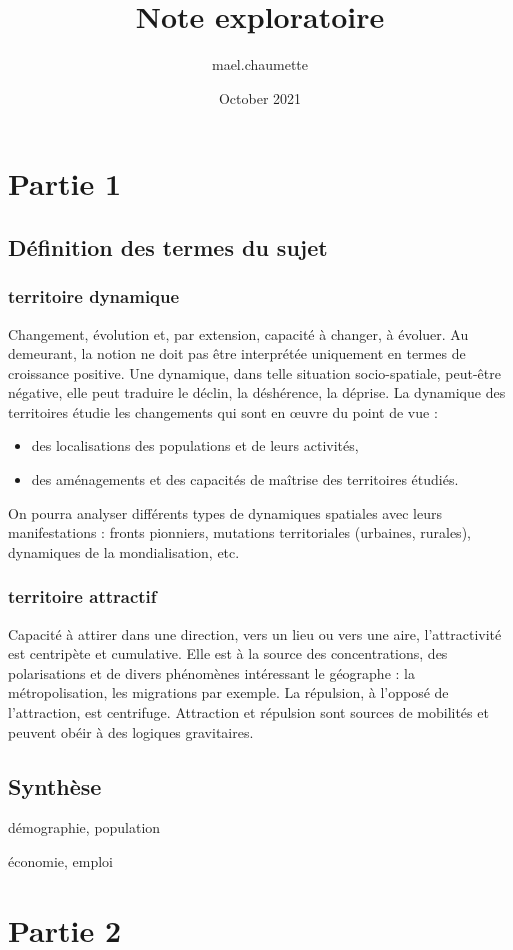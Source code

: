 \documentclass{article}
\title{Note exploratoire}
\author{mael.chaumette }
\date{October 2021}
\begin{document}
\maketitle

\section{Partie 1}
\subsection{Définition des termes du sujet}
\subsubsection{territoire dynamique}
Changement, évolution et, par extension, capacité à changer, à évoluer. Au demeurant, la notion ne doit pas être interprétée uniquement en termes de croissance positive. Une dynamique, dans telle situation socio-spatiale, peut-être négative, elle peut traduire le déclin, la déshérence, la déprise. La dynamique des territoires étudie les changements qui sont en œuvre du point de vue :
\begin{itemize}
    \item des localisations des populations et de leurs activités,
    \item des aménagements et des capacités de maîtrise des territoires étudiés.
\end{itemize}
On pourra analyser différents types de dynamiques spatiales avec leurs manifestations : fronts pionniers, mutations territoriales (urbaines, rurales), dynamiques de la mondialisation, etc.

\subsubsection{territoire attractif}
Capacité à attirer dans une direction, vers un lieu ou vers une aire, l'attractivité est centripète et cumulative. Elle est à la source des concentrations, des polarisations et de divers phénomènes intéressant le géographe : la métropolisation, les migrations par exemple.
La répulsion, à l'opposé de l'attraction, est centrifuge. Attraction et répulsion sont sources de mobilités et peuvent obéir à des logiques gravitaires.

\subsection{Synthèse}

démographie, population

\medbreak

économie, emploi


\section{Partie 2}
\end{document}
